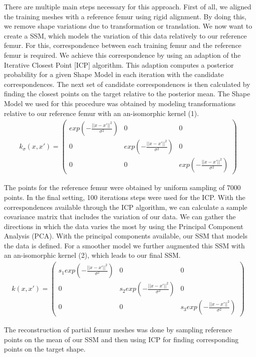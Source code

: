 \documentclass{article}
\begin{document}
	There are multiple main steps necessary for this approach. First of all, we aligned the training meshes with a reference femur using rigid alignment. By doing this, we remove shape variations due to transformation or translation. We now want to create a SSM, which models the variation of this data relatively to our reference femur. For this, correspondence between each training femur and the reference femur is required. We achieve this correspondence by using an adaption of the Iterative Closest Point [ICP] algorithm. This adaption computes a posterior probability for a given Shape Model in each iteration with the candidate correspondences. The next set of candidate correspondences is then calculated by finding the closest points on the target relative to the posterior mean.
	The Shape Model we used for this procedure was obtained by modeling transformations relative to our reference femur with an an-isomorphic kernel (1).
	\begin{align}
		k_\sigma(x, x') =
			\begin{pmatrix}
				exp(-\frac{||x-x'||^2}{\sigma^2})       & 0 & 0 \\
				0      & exp(-\frac{||x-x'||^2}{\sigma^2}) & 0  \\
				0	   & 0 & exp(-\frac{||x-x'||^2}{\sigma^2})
			\end{pmatrix}
	\end{align}
	
	The points for the reference femur were obtained by uniform sampling of 7000 points. In the final setting, 100 iterations steps were used for the ICP. With the correspondences available through the ICP algorithm, we can calculate a sample covariance matrix that includes the variation of our data. We can gather the directions in which the data varies the most by using the Principal Component Analysis (PCA). With the principal components available, our SSM that models the data is defined. For a smoother model we further augmented this SSM with an an-isomorphic kernel (2), which leads to our final SSM.
	\begin{align}
	k(x, x') =
	\begin{pmatrix}
	s_1 exp(-\frac{||x-x'||^2}{\sigma^2})       & 0 & 0 \\
	0      & s_2 exp(-\frac{||x-x'||^2}{\sigma^2}) & 0  \\
	0      & 0 &  s_3 exp(-\frac{||x-x'||^2}{\sigma^2})
	\end{pmatrix}
	\end{align}
	
	The reconstruction of partial femur meshes was done by sampling reference points on the mean of our SSM and then using ICP for finding corresponding points on the target shape. \\
	
\end{document}
